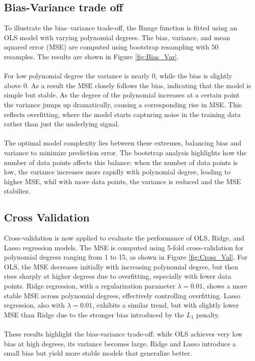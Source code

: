 \documentclass[
 reprint,            %
 amsmath,amssymb,
 aps,
]{revtex4-2}
\begin{document}
\subsection{Bias-Variance trade off}
\label{Bias-Variance trade off}
To illustrate the bias–variance trade-off, the Runge function is fitted using an OLS model with varying polynomial degrees.
The bias, variance, and mean squared error (MSE) are computed using bootstrap resampling with $50$ resamples.
The results are shown in Figure \ref{fig:Bias_Var}.\\\\
For low polynomial degree the variance is nearly $0$, while the bias is slightly above $0$.
As a result the MSE closely follows the bias, indicating that the model is simple but stable.
As the degree of the polynomial increases at a certain point the variance jumps up dramatically, causing a corresponding rise in MSE.
This reflects overfitting, where the model starts capturing noise in the training data rather than just the underlying signal.\\\\
The optimal model complexity lies between these extremes, balancing bias and variance to minimize prediction error.
The bootstrap analysis highlights how the number of data points affects this balance: when the number of data points is low, the variance increases more rapidly with polynomial degree, leading to higher MSE, whil with more data points, the variance is reduced and the MSE stabiliez.\\


\subsection{Cross Validation}
\label{Cross Validation}
Cross-validation is now applied to evaluate the performance of OLS, Ridge, and Lasso regression models.
The MSE is computed using 5-fold cross-validation for polynomial degrees ranging from 1 to 15, as shown in Figure \ref{fig:Cross_Val}.
For OLS, the MSE decreases initially with increasing polynomial degree, but then rises sharply at higher degrees due to overfitting, especially with fewer data points.
Ridge regression, with a regularization parameter $\lambda = 0.01$, shows a more stable MSE across polynomial degrees, effectively controlling overfitting.
Lasso regression, also with $\lambda = 0.01$, exhibits a similar trend, but with slightly lower MSE than Ridge due to the stronger bias introduced by the $L_1$ penalty.\\\\     
These results highlight the bias-variance trade-off: while OLS achieves very low bias at high degrees, its variance becomes large.
Ridge and Lasso introduce a small bias but yield more stable models that generalize better.

\end{document}
